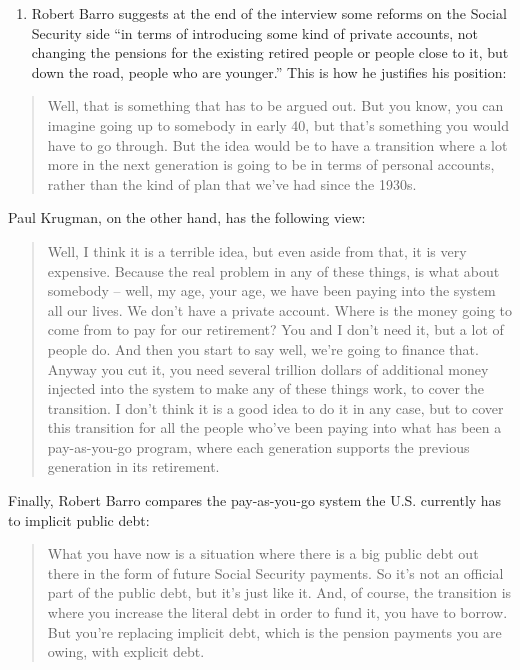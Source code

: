 \documentclass[]{book}
\providecommand{\tightlist}{%
  \setlength{\itemsep}{0pt}\setlength{\parskip}{0pt}}
\begin{document}
\begin{enumerate}
\def\labelenumi{\arabic{enumi}.}
\setcounter{enumi}{3}
\tightlist
\item
  Robert Barro suggests at the end of the interview some reforms on the
  Social Security side ``in terms of introducing some kind of private
  accounts, not changing the pensions for the existing retired people or
  people close to it, but down the road, people who are younger.'' This
  is how he justifies his position:
\end{enumerate}

\begin{quote}
Well, that is something that has to be argued out. But you know, you can
imagine going up to somebody in early 40, but that's something you would
have to go through. But the idea would be to have a transition where a
lot more in the next generation is going to be in terms of personal
accounts, rather than the kind of plan that we've had since the 1930s.
\end{quote}

Paul Krugman, on the other hand, has the following view:

\begin{quote}
Well, I think it is a terrible idea, but even aside from that, it is
very expensive. Because the real problem in any of these things, is what
about somebody -- well, my age, your age, we have been paying into the
system all our lives. We don't have a private account. Where is the
money going to come from to pay for our retirement? You and I don't need
it, but a lot of people do. And then you start to say well, we're going
to finance that. Anyway you cut it, you need several trillion dollars of
additional money injected into the system to make any of these things
work, to cover the transition. I don't think it is a good idea to do it
in any case, but to cover this transition for all the people who've been
paying into what has been a pay-as-you-go program, where each generation
supports the previous generation in its retirement.
\end{quote}

Finally, Robert Barro compares the pay-as-you-go system the U.S.
currently has to implicit public debt:

\begin{quote}
What you have now is a situation where there is a big public debt out
there in the form of future Social Security payments. So it's not an
official part of the public debt, but it's just like it. And, of course,
the transition is where you increase the literal debt in order to fund
it, you have to borrow. But you're replacing implicit debt, which is the
pension payments you are owing, with explicit debt.
\end{quote}
\end{document}
